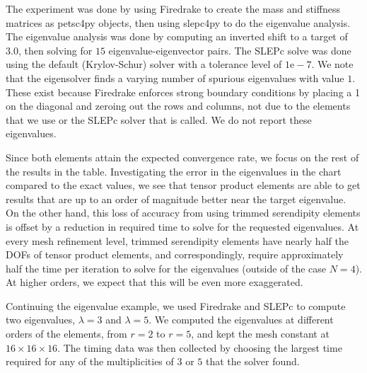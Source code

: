 \documentclass[format=acmsmall,screen,timestamp=false,a4paper]{acmart}
\begin{document}
The experiment was done by using Firedrake to create the mass and stiffness matrices as petsc4py objects, then using slepc4py to do the eigenvalue analysis.  The eigenvalue analysis was done by computing an inverted shift to a target of $3.0$, then solving for $15$ eigenvalue-eigenvector pairs.  The SLEPc solve was done using the default (Krylov-Schur) solver with a tolerance level of $1\text{e}-7$.
We note that the eigensolver finds a varying number of spurious eigenvalues with value $1$.  These exist because Firedrake enforces strong boundary conditions by placing a 1 on the diagonal and zeroing out the rows and columns, not due to the elements that we use or the SLEPc solver that is called.  We do not report these eigenvalues.

Since both elements attain the expected convergence rate, we focus on the rest of the results in the table.  Investigating the error in the eigenvalues in the chart compared to the exact values, we see that tensor product elements are able to get results that are up to an order of magnitude better near the target eigenvalue.  On the other hand, this loss of accuracy from using trimmed serendipity elements is offset by a reduction in required time to solve for the requested eigenvalues.  At every mesh refinement level, trimmed serendipity elements have nearly half the DOFs of tensor product elements, and correspondingly, require approximately half the time per iteration to solve for the eigenvalues (outside of the case $N=4$).  At higher orders, we expect that this will be even more exaggerated.  

Continuing the eigenvalue example, we used Firedrake and SLEPc to compute two eigenvalues, $\lambda = 3$ and $\lambda = 5$. We computed the eigenvalues at different orders of the elements, from $r=2$ to $r=5$, and kept the mesh constant at $16 \times 16 \times 16$.  The timing data was then collected by choosing the largest time required for any of the multiplicities of $3$ or $5$ that the solver found. 
\end{document}
